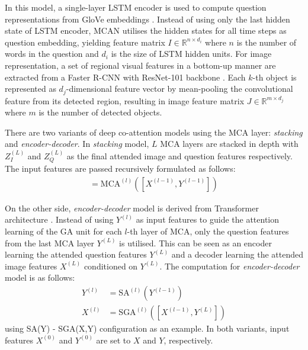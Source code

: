 \documentclass{article}
\begin{document}
In this model, a single-layer LSTM encoder \citep{lstm} is used to compute question representations from GloVe embeddings \citep{pennington2014glove}. Instead of using only the last hidden state of LSTM encoder, MCAN utilises the hidden states for all time steps as question embedding, yielding feature matrix $I \in \mathbb{R}^{n \times d_{i}}$ where $n$ is the number of words in the question and $d_{i}$ is the size of LSTM hidden units. For image representation, a set of regional visual features in a bottom-up manner \citep{Anderson_2018_CVPR} are extracted from a Faster R-CNN \citep{faster_rcnn} with ResNet-101 backbone \citep{residual}. Each $k$-th object is represented as $d_{j}$-dimensional feature vector by mean-pooling the convolutional feature from its detected region, resulting in image feature matrix $J \in \mathbb{R}^{m \times d_{j}}$ where $m$ is the number of detected objects.

There are two variants of deep co-attention models using the MCA layer: \textit{stacking} and \textit{encoder-decoder}. In \textit{stacking} model, $L$ MCA layers are stacked in depth with $Z_{I}^{(L)}$ and $Z_{Q}^{(L)}$ as the final attended image and question features respectively. The input features are passed recursively formulated as follows:
\begin{align}
    [X^{(l)}, Y^{(l)}] = \text{MCA}^{(l)}([X^{(l-1)}, Y^{(l-1)}])
\end{align}

On the other side, \textit{encoder-decoder} model is derived from Transformer architecture \citep{transformers}. Instead of using $Y^{(l)}$ as input features to guide the attention learning of the GA unit for each $l$-th layer of MCA, only the question features from the last MCA layer $Y^{(L)}$ is utilised. This can be seen as an encoder learning the attended question features $Y^{(L)}$ and a decoder learning the attended image features $X^{(L)}$ conditioned on $Y^{(L)}$. The computation for \textit{encoder-decoder} model is as follows:
\begin{align}
    Y^{(l)} &= \text{SA}^{(l)}(Y^{(l-1)}) \\
    X^{(l)} &= \text{SGA}^{(l)}([X^{(l-1)}, Y^{(L)}])
\end{align}
using SA(Y) - SGA(X,Y) configuration as an example. In both variants, input features $X^{(0)}$ and $Y^{(0)} $ are set to $X$ and $Y$, respectively.
\end{document}
